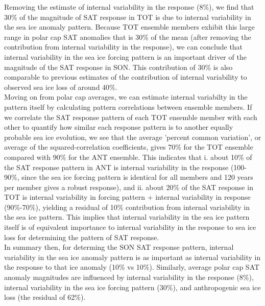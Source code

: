\documentclass[twocol]{ametsoc}
\begin{document}
Removing the estimate of internal variability in the response (8\%), we find that 30\% of the magnitude of SAT response in TOT is due to internal variability in the sea ice anomaly pattern. Because TOT ensemble members exhibit this large range in polar cap SAT anomalies that is 30\% of the mean (after removing the contribution from internal variability in the response), we can conclude that internal variability in the sea ice forcing pattern is an important driver of the magnitude of the SAT response in SON. This contribution of 30\% is also comparable to previous estimates of the contribution of internal variability to observed sea ice loss of around 40\%. \\

Moving on from polar cap averages, we can estimate internal variabilty in the pattern itself by calculating pattern correlations between ensemble members. If we correlate the SAT response pattern of each TOT ensemble member with each other to quantify how similar each response pattern is to another equally probable sea ice evolution, we see that the average 'percent common variation', or average of the squared-correlation coefficients, gives 70\% for the TOT ensemble compared with 90\% for the ANT ensemble. This indicates that i. about 10\% of the SAT response pattern in ANT is internal variability in the response (100-90\%, since the sea ice forcing pattern is identical for all members and 120 years per member gives a robust response), and ii. about 20\% of the SAT response in TOT is internal variability in forcing pattern + internal variability in response (90\%-70\%), yielding a residual of 10\% contribution from internal variability in the sea ice pattern. This implies that internal variability in the sea ice pattern itself is of equivalent importance to internal variability in the response to sea ice loss for determining the pattern of SAT response. \\

In summary then, for determing the SON SAT response pattern, internal variability in the sea ice anomaly pattern is as important as internal variability in the response to that ice anomaly (10\% vs 10\%). Similarly, average polar cap SAT anomaly magnitudes are influenced by internal variability in the response (8\%), internal variability in the sea ice forcing pattern (30\%), and anthropogenic sea ice loss (the residual of 62\%). \\ %
\end{document}
